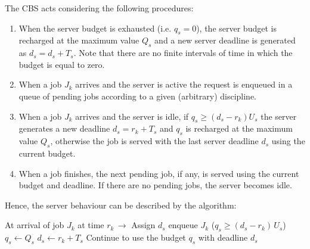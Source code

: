 
The CBS acts considering the following procedures:
\begin{enumerate}
    \item When the server budget is exhausted (i.e. $q_s = 0$), the server budget is recharged at the maximum value $Q_s$ and a new server deadline is generated as $d_s = d_s + T_s$. Note that there are no finite intervals of time in which the budget is equal to zero.
    \item When a job $J_k$ arrives and the server is active the request is enqueued in a queue of pending jobs according to a given (arbitrary) discipline.
    \item When a job $J_k$ arrives and the server is idle, if $q_s \ge (d_s - r_k) U_s$ the server generates a new deadline $d_s = r_k + T_s$ and $q_s$ is recharged at the maximum value $Q_s$, otherwise the job is served with the last server deadline $d_s$ using the current budget.
    \item When a job finishes, the next pending job, if any, is served using the current budget and deadline. If there are no pending jobs, the server becomes idle.
\end{enumerate}

Hence, the server behaviour can be described by the algorithm:
\begin{algorithm}
    \begin{algorithmic}
        \STATE At arrival of job $J_k$ at time $r_k\,\rightarrow$ Assign $d_s$ 
        \STATE enqueue $J_k$
        \ELSE
        \IF ($q_s \ge (d_s - r_k)\,U_s$)  %
        \STATE $q_s \leftarrow Q_s$       %
        \STATE $d_s \leftarrow r_k + T_s$ %
        \ELSE
        \STATE Continue to use the budget $q_s$ with deadline $d_s$
        \ENDIF
        \ENDIF
    \end{algorithmic}
\end{algorithm}


